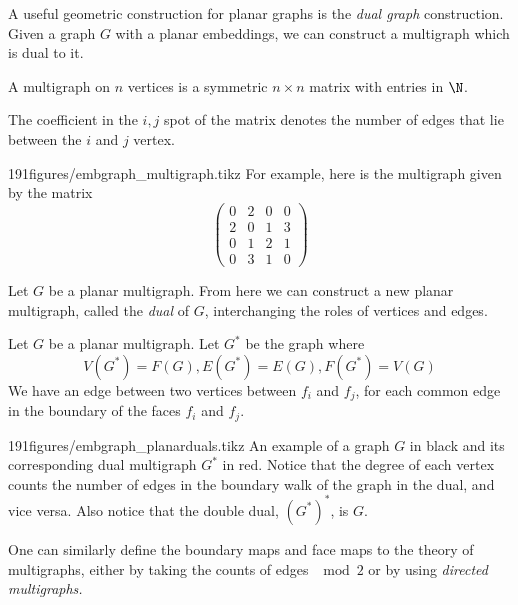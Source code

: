 A useful geometric construction for planar graphs is the \emph{dual graph} construction. Given a graph $G$ with a planar embeddings, we can construct a multigraph which is dual to it. 
\begin{definition}[Multigraph]
 A multigraph on $n$ vertices is a symmetric $n\times n$ matrix with entries in $\N$. 
\end{definition}
The coefficient in the $i,j$ spot of the matrix denotes the number of edges that lie between the $i $ and $j$ vertex. 

\begin{examplefigureenv}[Multigraph]{191figures/embgraph_multigraph.tikz}
  For example, here is the multigraph given by the matrix 
\[\begin{pmatrix}
0&2&0&0\\
2&0&1&3\\
0&1&2&1\\
0&3&1&0 \end{pmatrix}\]
\end{examplefigureenv}
Let $G$ be a planar multigraph. From here we can construct a new planar multigraph, called the \emph{dual} of $G$, interchanging the roles of vertices and edges. 
\begin{definition}
Let $G$ be a planar multigraph. Let $G^*$ be the graph where 
\[V(G^*)=F(G), E(G^*)=E(G), F(G^*)=V(G)\]
We have an edge between two vertices between $f_i$ and $f_j$, for each common edge in the boundary of the faces $f_i$ and $f_j$.
\label{def:dualgraph}
\end{definition}
\begin{examplefigureenv}{191figures/embgraph_planarduals.tikz}
  An example of a graph $G$ in black and its corresponding dual multigraph $G^*$ in red. Notice that the degree of each vertex counts the number of edges in the boundary walk of the graph in the dual, and vice versa. Also notice that the double dual, $(G^*)^*$, is $G$. 
\end{examplefigureenv}
One can similarly define the boundary maps and face maps to the theory of multigraphs, either by taking the counts of edges $\mod 2$ or by using \label{proj:dualsandhomology} \emph{directed multigraphs.} 


